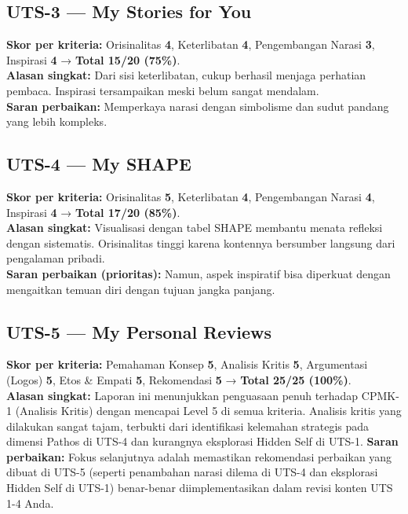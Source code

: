 \documentclass[
  letterpaper,
  DIV=11,
  numbers=noendperiod]{scrreprt}
\begin{document}
\subsection{UTS-3 --- My Stories for
You}\label{uts-3-my-stories-for-you-1}

\textbf{Skor per kriteria:} Orisinalitas \textbf{4}, Keterlibatan
\textbf{4}, Pengembangan Narasi \textbf{3}, Inspirasi \textbf{4} →
\textbf{Total 15/20 (75\%)}.\\
\textbf{Alasan singkat:} Dari sisi keterlibatan, cukup berhasil menjaga
perhatian pembaca. Inspirasi tersampaikan meski belum sangat mendalam.\\
\textbf{Saran perbaikan:} Memperkaya narasi dengan simbolisme dan sudut
pandang yang lebih kompleks.

\subsection{UTS-4 --- My SHAPE}\label{uts-4-my-shape}

\textbf{Skor per kriteria:} Orisinalitas \textbf{5}, Keterlibatan
\textbf{4}, Pengembangan Narasi \textbf{4}, Inspirasi \textbf{4} →
\textbf{Total 17/20 (85\%)}.\\
\textbf{Alasan singkat:} Visualisasi dengan tabel SHAPE membantu menata
refleksi dengan sistematis. Orisinalitas tinggi karena kontennya
bersumber langsung dari pengalaman pribadi.\\
\textbf{Saran perbaikan (prioritas):} Namun, aspek inspiratif bisa
diperkuat dengan mengaitkan temuan diri dengan tujuan jangka panjang.

\subsection{UTS-5 --- My Personal
Reviews}\label{uts-5-my-personal-reviews-1}

\textbf{Skor per kriteria:} Pemahaman Konsep \textbf{5}, Analisis Kritis
\textbf{5}, Argumentasi (Logos) \textbf{5}, Etos \& Empati \textbf{5},
Rekomendasi \textbf{5} → \textbf{Total 25/25 (100\%)}.\\
\textbf{Alasan singkat:} Laporan ini menunjukkan penguasaan penuh
terhadap CPMK-1 (Analisis Kritis) dengan mencapai Level 5 di semua
kriteria. Analisis kritis yang dilakukan sangat tajam, terbukti dari
identifikasi kelemahan strategis pada dimensi Pathos di UTS-4 dan
kurangnya eksplorasi Hidden Self di UTS-1. \textbf{Saran perbaikan:}
Fokus selanjutnya adalah memastikan rekomendasi perbaikan yang dibuat di
UTS-5 (seperti penambahan narasi dilema di UTS-4 dan eksplorasi Hidden
Self di UTS-1) benar-benar diimplementasikan dalam revisi konten UTS 1-4
Anda.
\end{document}
